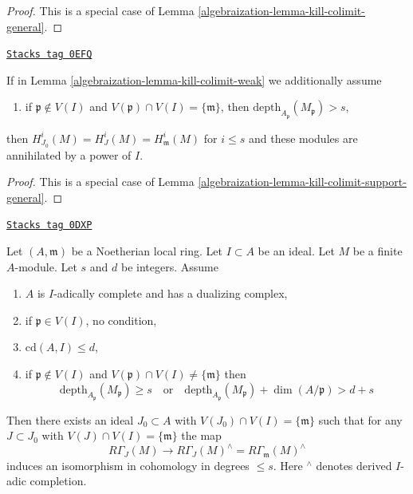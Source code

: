 \begin{proof}

This is a special case of Lemma \ref{algebraization-lemma-kill-colimit-general}.
\end{proof}

\begin{lemma}
\label{algebraization-lemma-kill-colimit-support}
\href{https://stacks.math.columbia.edu/tag/0EFQ}{\texttt{Stacks tag 0EFQ}}

If in Lemma \ref{algebraization-lemma-kill-colimit-weak} we additionally assume
\begin{enumerate}
\item[(6)] if $\mathfrak p \not \in V(I)$ and
$V(\mathfrak p) \cap V(I) = \{\mathfrak m\}$, then
$\text{depth}_{A_\mathfrak p}(M_\mathfrak p) > s$,
\end{enumerate}
then $H^i_{J_0}(M) = H^i_J(M) = H^i_\mathfrak m(M)$ for $i \leq s$
and these modules are annihilated by a power of $I$.
\end{lemma}

\begin{proof}

This is a special case of Lemma \ref{algebraization-lemma-kill-colimit-support-general}.
\end{proof}

\begin{lemma}
\label{algebraization-lemma-algebraize-local-cohomology}
\href{https://stacks.math.columbia.edu/tag/0DXP}{\texttt{Stacks tag 0DXP}}

Let $(A, \mathfrak m)$ be a Noetherian local ring.
Let $I \subset A$ be an ideal. Let $M$ be a finite $A$-module.
Let $s$ and $d$ be integers. Assume
\begin{enumerate}
\item $A$ is $I$-adically complete and has a dualizing complex,
\item if $\mathfrak p \in V(I)$, no condition,
\item $\text{cd}(A, I) \leq d$,
\item if $\mathfrak p \not \in V(I)$ and
$V(\mathfrak p) \cap V(I) \not = \{\mathfrak m\}$ then
$$
\text{depth}_{A_\mathfrak p}(M_\mathfrak p) \geq s
\quad\text{or}\quad
\text{depth}_{A_\mathfrak p}(M_\mathfrak p) + \dim(A/\mathfrak p) > d + s
$$
\end{enumerate}
Then there exists an ideal $J_0 \subset A$ with
$V(J_0) \cap V(I) = \{\mathfrak m\}$ such that for any $J \subset J_0$ with
$V(J) \cap V(I) = \{\mathfrak m\}$ the map
$$
R\Gamma_J(M) \longrightarrow
R\Gamma_J(M)^\wedge = R\Gamma_\mathfrak m(M)^\wedge
$$
induces an isomorphism in cohomology in degrees $\leq s$.
Here ${}^\wedge$ denotes derived $I$-adic completion.
\end{lemma}

